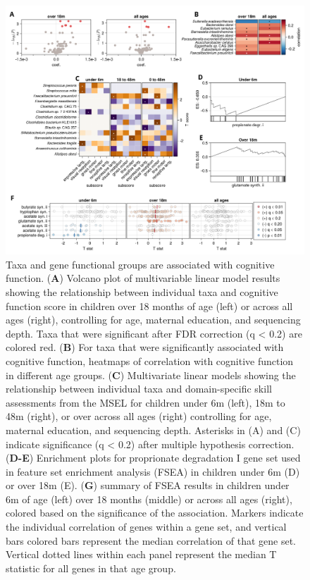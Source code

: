 \documentclass{article}
\begin{document}
\begin{figure}
    \centering
    \includegraphics[width=\textwidth]{assets/Figure2.png}
    \caption{
        Taxa and gene functional groups are associated with cognitive function.
        (\textbf{A}) Volcano plot of multivariable linear model results showing the
        relationship between individual taxa and cognitive function score in
        children over 18 months of age (left) or across all ages (right),
        controlling for age, maternal education, and sequencing depth.
        Taxa that were significant after FDR correction (q
        \textless{} 0.2) are colored red. (\textbf{B}) For taxa that were significantly
        associated with cognitive function,
        heatmaps of correlation with cognitive function in different age groups.
        (\textbf{C}) Multivariate linear models showing the relationship
        between individual taxa and domain-specific skill assessments
        from the MSEL for children under 6m (left), 18m to 48m (right),
        or over across all ages (right)
        controlling for age, maternal education, and sequencing depth.
        Asterisks in (A) and (C) indicate significance (q \textless{} 0.2)
        after multiple hypothesis correction.
        (\textbf{D-E}) Enrichment plots for proprionate degradation I gene set
        used in feature set enrichment analysis (FSEA) in children under 6m (D)
        or over 18m (E). (\textbf{G}) summary of FSEA
        results in children under 6m of age (left)
        over 18 months (middle) or across all ages (right), colored based on the
        significance of the association. Markers indicate the individual
        correlation of genes within a gene set,
        and vertical bars colored bars represent the
        median correlation of that gene set.
        Vertical dotted lines within each panel represent the median T statistic
        for all genes in that age group.
    }
    \label{fig:2}
\end{figure}
\end{document}
